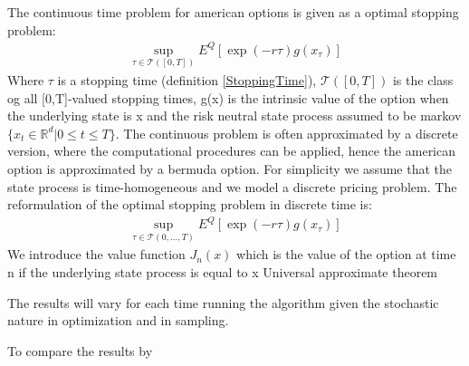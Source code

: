 The continuous time problem for american options is given as a optimal stopping problem:
\begin{align}
\sup_{\tau \in \mathcal{T}([0,T])} E^Q[\exp(-r\tau)g(x_{\tau})]
\end{align}
Where $\tau$ is a stopping time (definition \ref{StoppingTime}), $\mathcal{T}([0,T])$ is the class og all [0,T]-valued stopping times, g(x) is the intrinsic value of the option when the underlying state is x and the risk neutral state process assumed to be markov $\{x_t \in \mathbb{R}^{d} | 0 \leq t \leq T\}$. The continuous problem is often approximated by a discrete version, where the computational procedures can be applied, hence the american option is approximated by a bermuda option. For simplicity we assume that the state process is time-homogeneous and we model a discrete pricing problem. The reformulation of the optimal stopping problem in discrete time is:
\begin{align*}
\sup_{\tau \in \mathcal{T}(0,\ldots,T)} E^Q[\exp(-r\tau)g(x_{\tau})]
\end{align*}
We introduce the value function $J_n(x)$ which is the value of the option at time n if the underlying state process is equal to x
Universal approximate theorem

The results will vary for each time running the algorithm given the stochastic nature in optimization and in sampling.


To compare the results by 

